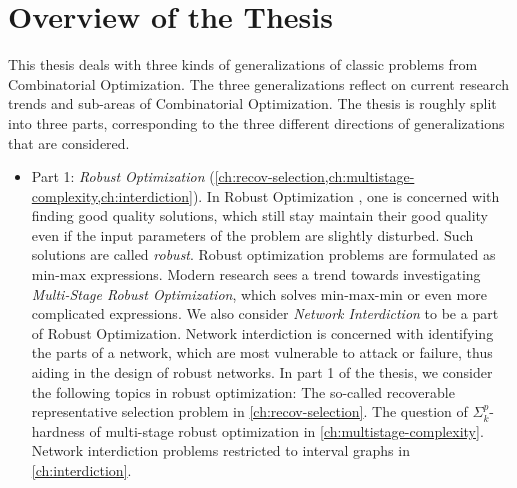 \section{Overview of the Thesis}

This thesis deals with three kinds of generalizations of classic problems from Combinatorial Optimization. 
The three generalizations reflect on current research trends and sub-areas of Combinatorial Optimization. 
The thesis is roughly split into three parts, corresponding to the three different directions of generalizations that are considered.

\begin{itemize}
\item Part 1: \emph{Robust Optimization} (\cref{ch:recov-selection,ch:multistage-complexity,ch:interdiction}). In Robust Optimization \cite{ben2009robust}, one is concerned with finding good quality solutions, 
which still stay maintain their good quality even if the input parameters of the problem are slightly disturbed. Such solutions are called \emph{robust}.
Robust optimization problems are formulated as min-max expressions. Modern research sees a trend towards investigating \emph{Multi-Stage Robust Optimization}, which solves min-max-min or even more complicated expressions.
 We also consider \emph{Network Interdiction} to be a part of Robust Optimization. 
Network interdiction is concerned with identifying the parts of a network, which are most vulnerable to attack or failure, thus aiding in the design of robust networks. 
In part 1 of the thesis, we consider the following topics in robust optimization: The so-called recoverable representative selection problem in \cref{ch:recov-selection}. The question of $\Sigma^p_k$-hardness of multi-stage robust optimization in \cref{ch:multistage-complexity}. 
Network interdiction problems restricted to interval graphs in \cref{ch:interdiction}.


\end{itemize}
